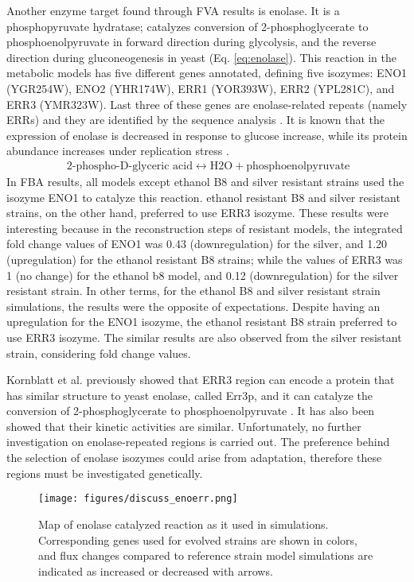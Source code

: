 Another enzyme target found through FVA results is enolase. It is a phosphopyruvate hydratase; catalyzes conversion of 2-phosphoglycerate to phosphoenolpyruvate in forward direction during glycolysis, and the reverse direction during gluconeogenesis in yeast (Eq. \ref{eq:enolase}). This reaction in the metabolic models has five different genes annotated, defining five isozymes: ENO1 (YGR254W), ENO2 (YHR174W), ERR1 (YOR393W), ERR2 (YPL281C), and ERR3 (YMR323W). Last three of these genes are enolase-related repeats (namely ERRs) and they are identified by the sequence analysis \cite{pryde1995sequence}. It is known that the expression of enolase is decreased in response to glucose increase, while its protein abundance increases under replication stress \cite{tkach2012dissecting}.
\begin{align}
  \label{eq:enolase}
  \ \text{2-phospho-D-glyceric acid} \leftrightarrow \text{H2O} + \text{phosphoenolpyruvate}
\end{align}
In FBA results, all models except ethanol B8 and silver resistant strains used the isozyme ENO1 to catalyze this reaction. ethanol resistant B8 and silver resistant strains, on the other hand, preferred to use ERR3 isozyme. These results were interesting because in the reconstruction steps of resistant models, the integrated fold change values of ENO1 was 0.43 (downregulation) for the silver, and 1.20 (upregulation) for the ethanol resistant B8 strains; while the values of ERR3 was 1 (no change) for the ethanol b8 model, and 0.12 (downregulation) for the silver resistant strain. In other terms, for the ethanol B8 and silver resistant strain simulations, the results were the opposite of expectations. Despite having an upregulation for the ENO1 isozyme, the ethanol resistant B8 strain preferred to use ERR3 isozyme. The similar results are also observed from the silver resistant strain, considering fold change values.

Kornblatt et al. previously showed that ERR3 region can encode a protein that has similar structure to yeast enolase, called Err3p, and it can catalyze the conversion of 2-phosphoglycerate to phosphoenolpyruvate \cite{kornblatt2013saccharomyces}. It has also been showed that their kinetic activities are similar. Unfortunately, no further investigation on enolase-repeated regions is carried out. The preference behind the selection of enolase isozymes could arise from adaptation, therefore these regions must be investigated genetically.

\begin{figure}[H]
\texttt{[image: figures/discuss\_enoerr.png]}
\caption[Map of enolase catalyzed reaction as it used in simulations]{Map of enolase catalyzed reaction as it used in simulations. Corresponding genes used for evolved strains are shown in colors, and flux changes compared to reference strain model simulations are indicated as increased or decreased with arrows.}
\label{fig:discuss_ENOERR}
\end{figure}

